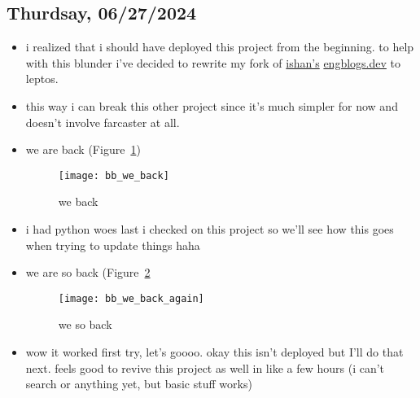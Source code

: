 \subsection*{Thurdsay, 06/27/2024}
\begin{itemize}
    \item i realized that i should have deployed this project from the
        beginning. to help with this blunder i've decided to rewrite my fork of
        \textcolor{blue}{\href{https://github.com/ishan0102/engblogs}{ishan's}}
        \textcolor{blue}{\href{https://engblogs.dev}{engblogs.dev}} to leptos.
    \item this way i can break this other project since it's much simpler for
        now and doesn't involve farcaster at all. 
    \item we are back (Figure~\ref{fig:bb_we_back})
        \begin{figure}[ht]
            \centering
            \texttt{[image: bb\_we\_back]}
            \captionsetup{labelfont=bf, textfont=it}
            \caption{we back}
            \label{fig:bb_we_back}
        \end{figure}
    \item i had python woes last i checked on this project so we'll see how this
        goes when trying to update things haha
    \item we are so back (Figure~\ref{fig:bb_we_back_again}
        \begin{figure}[ht]
            \centering
            \texttt{[image: bb\_we\_back\_again]}
            \captionsetup{labelfont=bf, textfont=it}
            \caption{we so back}
            \label{fig:bb_we_back_again}
        \end{figure}
    \item wow it worked first try, let's goooo. okay this isn't deployed but
        I'll do that next. feels good to revive this project as well in like a
        few hours (i can't search or anything yet, but basic stuff works)
\end{itemize}
